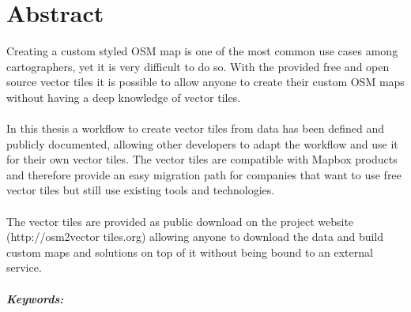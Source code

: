 

\begingroup
\let\clearpage\relax
\let\cleardoublepage\relax
\let\cleardoublepage\relax

\chapter*{Abstract} %

Creating a custom styled OSM map is one of the most common use cases
among cartographers, yet it is very difficult to do so. With the provided 
free and open source vector tiles it is possible to allow anyone to
create their custom OSM maps without having a deep knowledge of vector tiles.
\\\\
In this thesis a workflow to create vector tiles from \osm{} data has been defined and publicly documented, allowing other developers to adapt the workflow and use it for their own vector tiles.
The vector tiles are compatible with Mapbox products and therefore provide an easy migration path for companies that want to use free vector tiles but still use existing tools and technologies.
\\\\
The vector tiles are provided as public download on the project website (http://osm2vector tiles.org) allowing anyone to download the data and build custom maps and solutions on top of it without being bound to an external service.

\endgroup			

\paragraph{Keywords:}\mbox{}\\
\textit{\myKeywords}

\vfill
